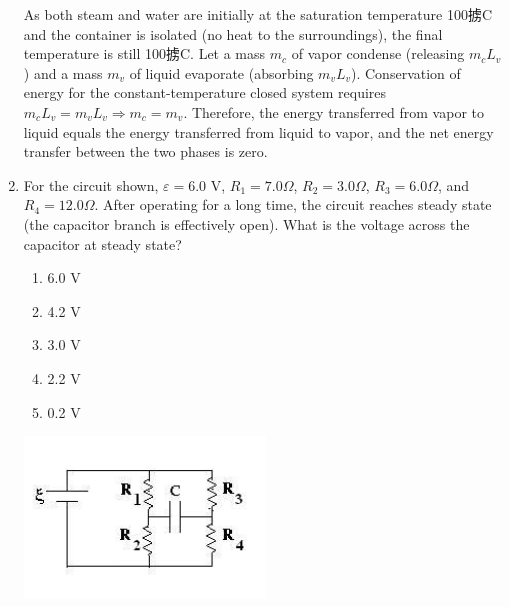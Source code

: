 ﻿\documentclass[12pt, a4paper]{article}
\begin{document}
\begin{CJK*}{UTF8}{gbsn}
\begin{enumerate}[itemsep=1.0em, topsep=0.6em]
\begin{solutionbox}
As both steam and water are initially at the saturation temperature 100掳C and the container is isolated (no heat to the surroundings), the final temperature is still 100掳C. Let a mass $m_c$ of vapor condense (releasing $m_cL_v$) and a mass $m_v$ of liquid evaporate (absorbing $m_vL_v$). Conservation of energy for the constant-temperature closed system requires $m_cL_v=m_vL_v\Rightarrow m_c=m_v$. Therefore, the energy transferred from vapor to liquid equals the energy transferred from liquid to vapor, and the net energy transfer between the two phases is zero.
\end{solutionbox}

\newpage

\item \label{prob:7}
\noindent\begin{minipage}[t]{0.6\linewidth}
\vspace{0pt}
For the circuit shown, $\varepsilon = 6.0$ V, $R_1 = 7.0 \Omega$, $R_2 = 3.0 \Omega$, $R_3 = 6.0 \Omega$, and $R_4 = 12.0 \Omega$. After operating for a long time, the circuit reaches steady state (the capacitor branch is effectively open). What is the voltage across the capacitor at steady state?
\begin{enumerate}[label=(\Alph*)]
    \item 6.0 V
    \item 4.2 V
    \item 3.0 V
    \item 2.2 V
    \item 0.2 V
\end{enumerate}
\end{minipage}%
\hfill
\begin{minipage}[t]{0.33\linewidth}
\vspace{0pt}
\centering
\includegraphics[width=\linewidth]{Problem_07_Figure.png}
\end{minipage}


\end{enumerate}
\end{CJK*}
\end{document}
